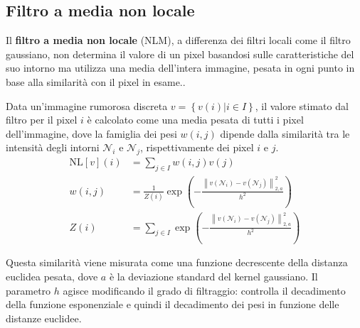 \documentclass[../main.tex]{subfiles}
\begin{document}
	\subsection{Filtro a media non locale}
	
	Il \textbf{filtro a media non locale} (NLM), a differenza dei filtri locali come il filtro gaussiano, non determina il valore di un pixel basandosi sulle caratteristiche del suo intorno ma utilizza una media dell'intera immagine, pesata in ogni punto in base alla similarità con il pixel in esame.\cite{buades_2011}.
	
	Data un'immagine rumorosa discreta $v = \left\{v(i) | i\in I\right\}$, il valore stimato dal filtro per il pixel $i$ è calcolato come una media pesata di tutti i pixel dell'immagine, dove la famiglia dei pesi $w(i,j)$ dipende dalla similarità tra le intensità degli intorni $\mathcal{N}_i$ e $\mathcal{N}_j$, rispettivamente dei pixel $i$ e $j$.
	\begin{align}
		\text{NL}[v](i) &= \sum_{j\in I}w(i,j)v(j)\\
		w(i,j) &= \frac{1}{Z(i)}\exp\left(-\frac{\left\lVert v(\mathcal{N}_i) - v(\mathcal{N}_j) \right\lVert^2_{2,a}}{h^2}\right)\\
		Z(i) &= \sum_{j\in I}\exp\left(-\frac{\left\lVert v(\mathcal{N}_i) - v(\mathcal{N}_j) \right\lVert^2_{2,a}}{h^2}\right)
	\end{align}
	
	Questa similarità viene misurata come una funzione decrescente della distanza euclidea pesata, dove $a$ è la deviazione standard del kernel gaussiano. Il parametro $h$ agisce modificando il grado di filtraggio: controlla il decadimento della funzione esponenziale e quindi il decadimento dei pesi in funzione delle distanze euclidee.\cite{buades_2005}\\
	
\end{document}
